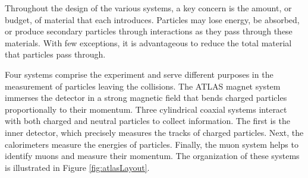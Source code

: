 Throughout the design of the various systems, a key concern is the amount, or budget, of material that each introduces.
Particles may lose energy, be absorbed, or produce secondary particles through interactions as they pass through these materials.
With few exceptions, it is advantageous to reduce the total material that particles pass through.

Four systems comprise the experiment and serve different purposes in the measurement of particles leaving the collisions.
The ATLAS magnet system immerses the detector in a strong magnetic field that bends charged particles proportionally to their momentum.
Three cylindrical coaxial systems interact with both charged and neutral particles to collect information.
The first is the inner detector, which precisely measures the tracks of charged particles.
Next, the calorimeters measure the energies of particles.
Finally, the muon system helps to identify muons and measure their momentum.
The organization of these systems is illustrated in Figure \ref{fig:atlasLayout}.

